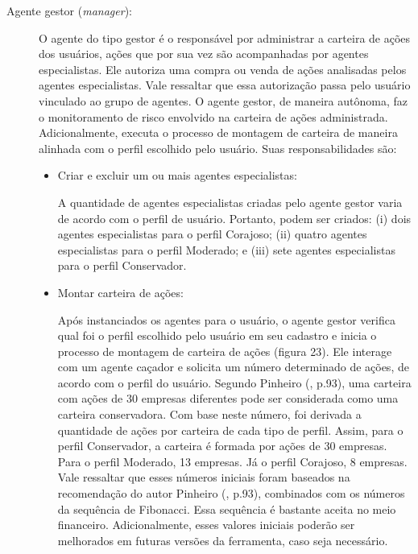\begin{description}
\item[Agente gestor (\textit{manager}):]
O agente do tipo gestor é o responsável por administrar a carteira de ações dos usuários, ações que por sua vez são acompanhadas por agentes especialistas. Ele autoriza uma compra ou venda de ações analisadas pelos agentes especialistas. Vale ressaltar que essa autorização passa pelo usuário vinculado ao grupo de agentes. O agente gestor, de maneira autônoma, faz o monitoramento de risco envolvido na carteira de ações administrada. Adicionalmente, executa o processo de montagem de carteira de maneira alinhada com o perfil escolhido pelo usuário. Suas responsabilidades são:

\begin{itemize}
\item Criar e excluir um ou mais agentes especialistas:\newline

A quantidade de agentes especialistas criadas pelo agente gestor varia  de acordo com o perfil de usuário. Portanto, podem ser criados: (i) dois agentes especialistas para o perfil Corajoso; (ii) quatro agentes especialistas para o perfil Moderado; e (iii) sete agentes especialistas para o perfil Conservador.

\item Montar carteira de ações:\newline

Após instanciados os agentes para o usuário, o agente gestor verifica qual foi o perfil escolhido pelo usuário em seu cadastro e inicia o processo de montagem de carteira de ações (figura 23). Ele interage com um agente caçador e solicita um número determinado de ações, de acordo com o perfil do usuário. Segundo Pinheiro (\citeyear{pinheiro2008}, p.93), uma carteira com ações de 30 empresas diferentes pode ser considerada como uma carteira conservadora. Com base neste número, foi derivada a quantidade de ações por carteira de cada tipo de perfil. Assim, para o perfil Conservador, a carteira é formada por ações de 30 empresas. Para o perfil Moderado, 13 empresas. Já o perfil Corajoso, 8 empresas. Vale ressaltar que esses números iniciais foram baseados na recomendação do autor Pinheiro (\citeyear{pinheiro2008}, p.93), combinados com os números da sequência de Fibonacci. Essa sequência é bastante aceita no meio financeiro. Adicionalmente, esses valores iniciais poderão ser melhorados em futuras versões da ferramenta, caso seja necessário.


\end{itemize}
\end{description}
